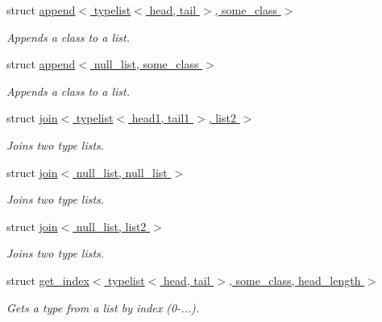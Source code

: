 \begin{DoxyCompactItemize}
struct \hyperlink{structavrpp_1_1typelist_1_1append_3_01typelist_3_01head_00_01tail_01_4_00_01some__class_01_4}{append$<$ typelist$<$ head, tail $>$, some\_\-class $>$}
\begin{DoxyCompactList}\small\item\em Appends a class to a list. \item\end{DoxyCompactList}\item 
struct \hyperlink{structavrpp_1_1typelist_1_1append_3_01null__list_00_01some__class_01_4}{append$<$ null\_\-list, some\_\-class $>$}
\begin{DoxyCompactList}\small\item\em Appends a class to a list. \item\end{DoxyCompactList}\item 
struct \hyperlink{structavrpp_1_1typelist_1_1join_3_01typelist_3_01head1_00_01tail1_01_4_00_01list2_01_4}{join$<$ typelist$<$ head1, tail1 $>$, list2 $>$}
\begin{DoxyCompactList}\small\item\em Joins two type lists. \item\end{DoxyCompactList}\item 
struct \hyperlink{structavrpp_1_1typelist_1_1join_3_01null__list_00_01null__list_01_4}{join$<$ null\_\-list, null\_\-list $>$}
\begin{DoxyCompactList}\small\item\em Joins two type lists. \item\end{DoxyCompactList}\item 
struct \hyperlink{structavrpp_1_1typelist_1_1join_3_01null__list_00_01list2_01_4}{join$<$ null\_\-list, list2 $>$}
\begin{DoxyCompactList}\small\item\em Joins two type lists. \item\end{DoxyCompactList}\item 
struct \hyperlink{structavrpp_1_1typelist_1_1get__index_3_01typelist_3_01head_00_01tail_01_4_00_01some__class_00_01head__length_01_4}{get\_\-index$<$ typelist$<$ head, tail $>$, some\_\-class, head\_\-length $>$}
\begin{DoxyCompactList}\small\item\em Gets a type from a list by index (0-\/...). \item\end{DoxyCompactList}\item 

\end{DoxyCompactItemize}
